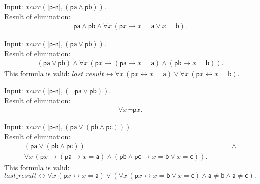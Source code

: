 \documentclass[a4paper]{article}
\newcommand{\imp}{\rightarrow}
\newcommand{\equi}{\leftrightarrow}
\newcommand{\pplmacro}[1]{\mathit{#1}}
\newcommand{\pplIsValid}[1]{\noindent This formula is valid: $#1$\par}
\begin{document}
\noindent Input: $\pplmacro{xcirc}({[}\mathsf{p}\textrm{-}\mathsf{n}{]},(\mathsf{p}\mathsf{a} \land  \mathsf{p}\mathsf{b})).$\\
\noindent Result of elimination:
\[\begin{array}{lllll}
\mathsf{p}\mathsf{a} \land  \mathsf{p}\mathsf{b} \land  \forall \mathit{x} \, (\mathsf{p}\mathit{x} \imp  \mathit{x}=\mathsf{a} \lor  \mathit{x}=\mathsf{b}).
\end{array}
\]

\noindent Input: $\pplmacro{xcirc}({[}\mathsf{p}\textrm{-}\mathsf{n}{]},(\mathsf{p}\mathsf{a} \lor  \mathsf{p}\mathsf{b})).$\\
\noindent Result of elimination:
\[\begin{array}{lllll}
(\mathsf{p}\mathsf{a} \lor  \mathsf{p}\mathsf{b}) \land  \forall \mathit{x} \, (\mathsf{p}\mathit{x} \imp  (\mathsf{p}\mathsf{a} \imp  \mathit{x}=\mathsf{a}) \land  (\mathsf{p}\mathsf{b} \imp  \mathit{x}=\mathsf{b})).
\end{array}
\]
\pplIsValid{\pplmacro{last\_result} \equi  \forall \mathit{x} \, (\mathsf{p}\mathit{x} \equi  \mathit{x}=\mathsf{a}) \lor  \forall \mathit{x} \, (\mathsf{p}\mathit{x} \equi  \mathit{x}=\mathsf{b}).}
%
%

\medskip


\noindent Input: $\pplmacro{xcirc}({[}\mathsf{p}\textrm{-}\mathsf{n}{]},(\lnot  \mathsf{p}\mathsf{a} \lor  \mathsf{p}\mathsf{b})).$\\
\noindent Result of elimination:
\[\begin{array}{lllll}
\forall \mathit{x} \, \lnot  \mathsf{p}\mathit{x}.
\end{array}
\]

\noindent Input: $\pplmacro{xcirc}({[}\mathsf{p}\textrm{-}\mathsf{n}{]},(\mathsf{p}\mathsf{a} \lor  (\mathsf{p}\mathsf{b} \land  \mathsf{p}\mathsf{c}))).$\\
\noindent Result of elimination:
\[\begin{array}{lllll}
(\mathsf{p}\mathsf{a} \lor  (\mathsf{p}\mathsf{b} \land  \mathsf{p}\mathsf{c})) &&&&\; \land \\
\forall \mathit{x} \, (\mathsf{p}\mathit{x} \imp  (\mathsf{p}\mathsf{a} \imp  \mathit{x}=\mathsf{a}) \land  (\mathsf{p}\mathsf{b} \land  \mathsf{p}\mathsf{c} \imp  \mathit{x}=\mathsf{b} \lor  \mathit{x}=\mathsf{c})).
\end{array}
\]
\pplIsValid{\pplmacro{last\_result} \equi  \forall \mathit{x} \, (\mathsf{p}\mathit{x} \equi  \mathit{x}=\mathsf{a}) \lor  (\forall \mathit{x} \, (\mathsf{p}\mathit{x} \equi  \mathit{x}=\mathsf{b} \lor  \mathit{x}=\mathsf{c}) \land  \mathsf{a}\neq \mathsf{b} \land  \mathsf{a}\neq \mathsf{c}).}
%
%
\end{document}
